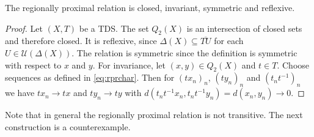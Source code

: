 \begin{theorem}
  The regionally proximal relation is closed, invariant, symmetric and reflexive.
\end{theorem}

\begin{proof}
  Let $(X, T)$ be a TDS.
  The set $Q_2(X)$ is an intersection of closed sets and therefore closed.
  It is reflexive, since $\Delta(X) \subseteq \overline{TU}$ for each $U \in \mathcal{U}(\Delta(X))$.
  The relation is symmetric since the definition is symmetric with respect to $x$ and $y$.
  For invariance, let $(x, y) \in Q_2(X)$ and $t \in T$.
  Choose sequences as defined in \cref{eq:rprchar}.
  Then for $(tx_n)_n$, $(t y_n)_n$ and $(t_nt^{-1})_n$ we have $t x_n \to tx$ and $t y_n \to ty$ with $d(t_nt^{-1}x_n, t_nt^{-1}y_n) = d(x_n, y_n) \to 0$.
\end{proof}

Note that in general the regionally proximal relation is not transitive.
The next construction is a counterexample.

